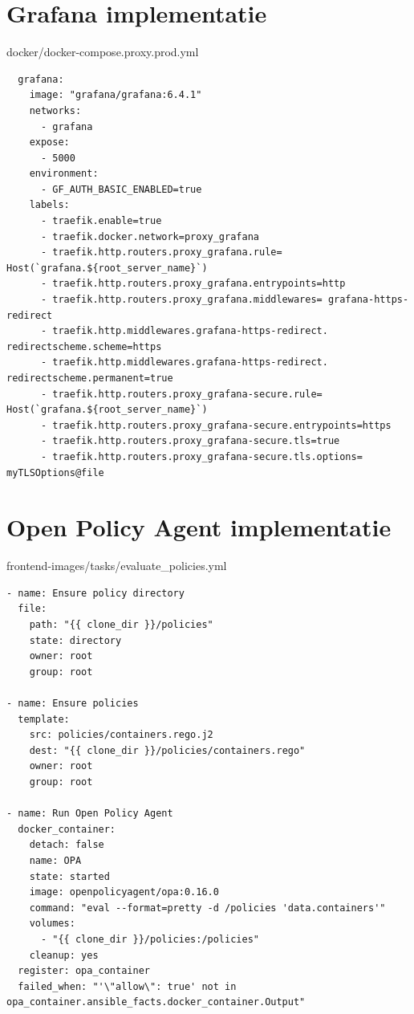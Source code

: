 \section{Grafana implementatie} \label{GrafanaImplementatie}
docker/docker-compose.proxy.prod.yml
\begin{verbatim}
  grafana:
    image: "grafana/grafana:6.4.1"
    networks:
      - grafana
    expose:
      - 5000
    environment:
      - GF_AUTH_BASIC_ENABLED=true
    labels:
      - traefik.enable=true
      - traefik.docker.network=proxy_grafana
      - traefik.http.routers.proxy_grafana.rule= Host(`grafana.${root_server_name}`)
      - traefik.http.routers.proxy_grafana.entrypoints=http
      - traefik.http.routers.proxy_grafana.middlewares= grafana-https-redirect
      - traefik.http.middlewares.grafana-https-redirect. redirectscheme.scheme=https
      - traefik.http.middlewares.grafana-https-redirect. redirectscheme.permanent=true
      - traefik.http.routers.proxy_grafana-secure.rule= Host(`grafana.${root_server_name}`)
      - traefik.http.routers.proxy_grafana-secure.entrypoints=https
      - traefik.http.routers.proxy_grafana-secure.tls=true
      - traefik.http.routers.proxy_grafana-secure.tls.options= myTLSOptions@file
\end{verbatim}

\section{Open Policy Agent implementatie} \label{OPAImplementatie}

frontend-images/tasks/evaluate\_policies.yml
\begin{verbatim}
- name: Ensure policy directory
  file:
    path: "{{ clone_dir }}/policies"
    state: directory
    owner: root
    group: root

- name: Ensure policies
  template:
    src: policies/containers.rego.j2
    dest: "{{ clone_dir }}/policies/containers.rego"
    owner: root
    group: root

- name: Run Open Policy Agent
  docker_container:
    detach: false
    name: OPA
    state: started
    image: openpolicyagent/opa:0.16.0
    command: "eval --format=pretty -d /policies 'data.containers'"
    volumes:
      - "{{ clone_dir }}/policies:/policies"
    cleanup: yes
  register: opa_container
  failed_when: "'\"allow\": true' not in opa_container.ansible_facts.docker_container.Output"
\end{verbatim}

